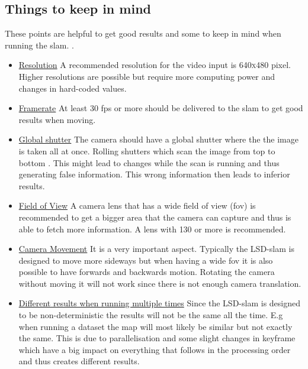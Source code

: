 \subsection{Things to keep in mind}\label{ref:lsdslamgetgoodresults}
These points are helpful to get good results and some to keep in mind when running the \gls{slam}. \cite{githublsdslamtum}.
\begin{itemize}
    \item \underline{Resolution} \newline
    A recommended resolution for the video input is \textsc{640x480} pixel. Higher resolutions are possible but require more computing power and changes in hard-coded values.
    
    \item \underline{Framerate} \newline
    At least 30 \gls{fps} or more should be delivered to the \gls{slam} to get good results when moving.
    
    \item \underline{Global shutter} \newline
    The camera should have a global shutter where the the image is taken all at once. Rolling shutters which scan the image from top to bottom \cite{globalrollingshutter}. This might lead to changes while the scan is running and thus generating false information. This wrong information then leads to inferior results.
    
    \item \underline{Field of View} \newline
    A camera lens that has a wide field of view (\gls{fov}) is recommended to get a bigger area that the camera can capture and thus is able to fetch more information. A lens with \textsc{130\degree} or more is recommended.
    
    \item \underline{Camera Movement} \newline
    It is a very important aspect. Typically the LSD-\gls{slam} is designed to move more sideways but when having a wide \gls{fov} it is also possible to have forwards and backwards motion.
    Rotating the camera without moving it will not work since there is not enough camera translation. 
    
    \item \underline{Different results when running multiple times} \newline
    Since the LSD-\gls{slam} is designed to be non-deterministic the results will not be the same all the time. E.g when running a dataset the map will most likely be similar but not exactly the same. This is due to parallelisation and some slight changes in keyframe which have a big impact on everything that follows in the processing order and thus creates different results.
    
\end{itemize}



